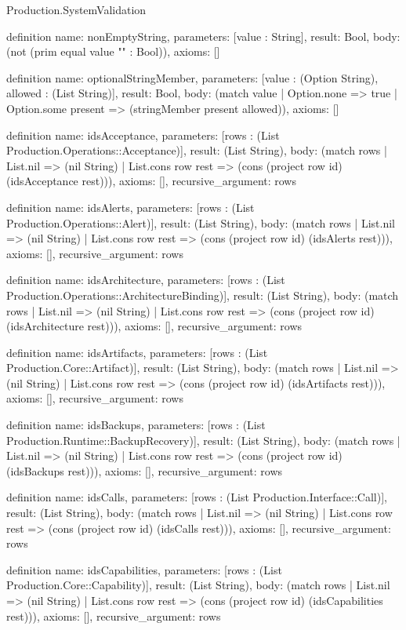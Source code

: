 \begin{lexlean}{Production.SystemValidation}
\begin{semanticmodule}
definition{
  name: nonEmptyString,
  parameters: [value : String],
  result: Bool,
  body: (not (prim equal value "" : Bool)),
  axioms: []
}

definition{
  name: optionalStringMember,
  parameters: [value : (Option String), allowed : (List String)],
  result: Bool,
  body: (match value | Option.none => true | Option.some present => (stringMember present allowed)),
  axioms: []
}

definition{
  name: idsAcceptance,
  parameters: [rows : (List Production.Operations::Acceptance)],
  result: (List String),
  body: (match rows
    | List.nil => (nil String)
    | List.cons row rest => (cons (project row id) (idsAcceptance rest))),
  axioms: [],
  recursive_argument: rows
}

definition{
  name: idsAlerts,
  parameters: [rows : (List Production.Operations::Alert)],
  result: (List String),
  body: (match rows
    | List.nil => (nil String)
    | List.cons row rest => (cons (project row id) (idsAlerts rest))),
  axioms: [],
  recursive_argument: rows
}

definition{
  name: idsArchitecture,
  parameters: [rows : (List Production.Operations::ArchitectureBinding)],
  result: (List String),
  body: (match rows
    | List.nil => (nil String)
    | List.cons row rest => (cons (project row id) (idsArchitecture rest))),
  axioms: [],
  recursive_argument: rows
}

definition{
  name: idsArtifacts,
  parameters: [rows : (List Production.Core::Artifact)],
  result: (List String),
  body: (match rows
    | List.nil => (nil String)
    | List.cons row rest => (cons (project row id) (idsArtifacts rest))),
  axioms: [],
  recursive_argument: rows
}

definition{
  name: idsBackups,
  parameters: [rows : (List Production.Runtime::BackupRecovery)],
  result: (List String),
  body: (match rows
    | List.nil => (nil String)
    | List.cons row rest => (cons (project row id) (idsBackups rest))),
  axioms: [],
  recursive_argument: rows
}

definition{
  name: idsCalls,
  parameters: [rows : (List Production.Interface::Call)],
  result: (List String),
  body: (match rows
    | List.nil => (nil String)
    | List.cons row rest => (cons (project row id) (idsCalls rest))),
  axioms: [],
  recursive_argument: rows
}

definition{
  name: idsCapabilities,
  parameters: [rows : (List Production.Core::Capability)],
  result: (List String),
  body: (match rows
    | List.nil => (nil String)
    | List.cons row rest => (cons (project row id) (idsCapabilities rest))),
  axioms: [],
  recursive_argument: rows
}


\end{semanticmodule}
\end{lexlean}
